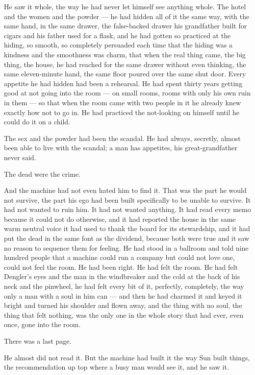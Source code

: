 \documentclass[11pt,openany]{book}
\newcommand{\scenebreak}{\par\vspace{0.5\baselineskip}\begin{center}\textasteriskcentered\quad\textasteriskcentered\quad\textasteriskcentered\end{center}\vspace{0.5\baselineskip}\par}
\begin{document}
He saw it whole, the way he had never let himself see anything whole. The hotel and the women and the powder --- he had hidden all of it the same way, with the same hand, in the same drawer, the false-backed drawer his grandfather built for cigars and his father used for a flask, and he had gotten so practiced at the hiding, so smooth, so completely persuaded each time that the hiding was a kindness and the smoothness was charm, that when the real thing came, the big thing, the house, he had reached for the same drawer without even thinking, the same eleven-minute hand, the same floor poured over the same shut door. Every appetite he had hidden had been a rehearsal. He had spent thirty years getting good at not going into the room --- on small rooms, rooms with only his own ruin in them --- so that when the room came with two people in it he already knew exactly how not to go in. He had practiced the not-looking on himself until he could do it on a child.

The sex and the powder had been the scandal. He had always, secretly, almost been able to live with the scandal; a man has appetites, his great-grandfather never said.

The dead were the crime.

And the machine had not even hated him to find it. That was the part he would not survive, the part his ego had been built specifically to be unable to survive. It had not wanted to ruin him. It had not wanted anything. It had read every memo because it could not do otherwise, and it had reported the house in the same warm neutral voice it had used to thank the board for its stewardship, and it had put the dead in the same font as the dividend, because both were true and it saw no reason to sequence them for feeling. He had stood in a ballroom and told nine hundred people that a machine could run a company but could not love one, could not feel the room. He had been right. He had felt the room. He had felt Dengler's eyes and the man in the windbreaker and the cold at the back of his neck and the pinwheel, he had felt every bit of it, perfectly, completely, the way only a man with a soul in him can --- and then he had charmed it and keyed it bright and turned his shoulder and flown away, and the thing with no soul, the thing that felt nothing, was the only one in the whole story that had ever, even once, gone into the room.


\scenebreak


There was a last page.

He almost did not read it. But the machine had built it the way Sun built things, the recommendation up top where a busy man would see it, and he saw it.
\end{document}
